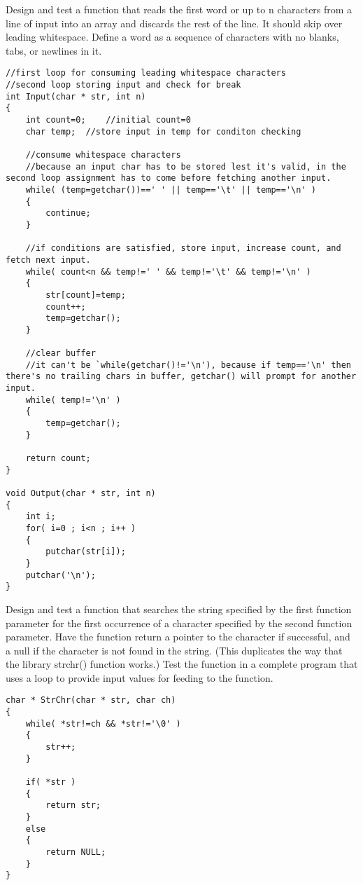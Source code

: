 \begin{question}
Design and test a function that reads the first word or up to n characters from a line of input into an array and
discards the rest of the line. It should skip over leading whitespace. Define a word as a
sequence of characters with no blanks, tabs, or newlines in it.  
\end{question}
\begin{solution}
  \begin{verbatim}
//first loop for consuming leading whitespace characters
//second loop storing input and check for break
int Input(char * str, int n)
{
	int count=0;	//initial count=0
	char temp;	//store input in temp for conditon checking

	//consume whitespace characters
	//because an input char has to be stored lest it's valid, in the second loop assignment has to come before fetching another input.
	while( (temp=getchar())==' ' || temp=='\t' || temp=='\n' )
	{
		continue;
	}

	//if conditions are satisfied, store input, increase count, and fetch next input.
	while( count<n && temp!=' ' && temp!='\t' && temp!='\n' )
	{
		str[count]=temp;
		count++;
		temp=getchar();
	}

	//clear buffer
	//it can't be `while(getchar()!='\n'), because if temp=='\n' then there's no trailing chars in buffer, getchar() will prompt for another input.
	while( temp!='\n' )
	{
		temp=getchar();
	}

	return count;
}

void Output(char * str, int n)
{
	int i;
	for( i=0 ; i<n ; i++ )
	{
		putchar(str[i]);
	}
	putchar('\n');
}
  \end{verbatim}
\end{solution}

\begin{question}
   Design and test a function that searches the string specified by the first function
   parameter for the first occurrence of a character specified by the second function
   parameter. Have the function return a pointer to the character if successful, and a null
   if the character is not found in the string. (This duplicates the way that the library
   strchr() function works.) Test the function in a complete program that uses a loop to
   provide input values for feeding to the function.
\end{question}
\begin{solution}
  \begin{verbatim}
char * StrChr(char * str, char ch)
{
	while( *str!=ch && *str!='\0' )
	{
		str++;
	}

	if( *str )
	{
		return str;
	}
	else
	{
		return NULL;
	}
}
  \end{verbatim}
\end{solution}

